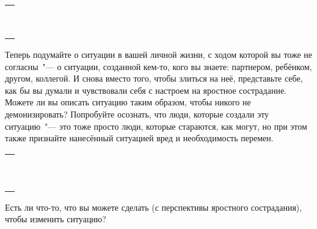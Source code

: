 \setlength{\extrarowheight}{2mm}
\begin{tabularx}{0.96\textwidth}{X}
	\\
	\arrayrulecolor{gray}\hline\\
	\hline\\
	\hline\\
	\hline\\
	\hline\\
	\hline\\	
	\hline\\
	\hline\\
	\hline\\
	\hline\\
\end{tabularx}
\setlength{\extrarowheight}{0mm}
\begin{itemize}
	\itemWritingHand Теперь подумайте о ситуации в вашей личной жизни, с ходом которой вы тоже не согласны~"--- о ситуации, созданной кем-то, кого вы знаете: партнером, ребёнком, другом, коллегой. И снова вместо того, чтобы злиться на неё, представьте себе, как бы вы думали и чувствовали себя с настроем на яростное сострадание. Можете ли вы описать ситуацию таким образом, чтобы никого не демонизировать? Попробуйте осознать, что люди, которые создали эту ситуацию~"--- это тоже просто люди, которые стараются, как могут, но при этом также признайте нанесённый ситуацией вред и необходимость перемен.
\end{itemize}

\setlength{\extrarowheight}{2mm}
\begin{tabularx}{0.96\textwidth}{X}
	\\
	\arrayrulecolor{gray}\hline\\
	\hline\\
	\hline\\
	\hline\\
	\hline\\
	\hline\\	
	\hline\\
	\hline\\
	\hline\\
	\hline\\
	\hline\\
\end{tabularx}
\setlength{\extrarowheight}{0mm}
\begin{itemize}
	\itemWritingHand Есть ли что-то, что вы можете сделать (с перспективы яростного сострадания), чтобы изменить ситуацию?
\end{itemize}

